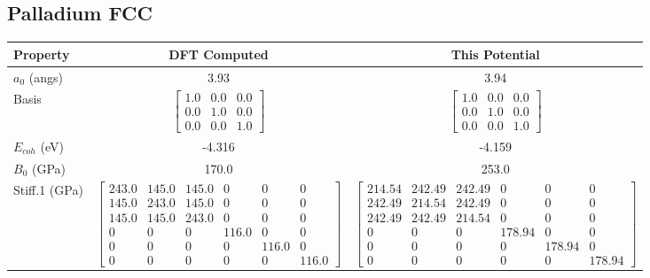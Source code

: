 
\clearpage
\FloatBarrier
\subsection{Palladium FCC}

\begin{table}[ht]
\renewcommand{\arraystretch}{1.2}
\begin{tabular}{lcccccc}
\hline\hline
Property & \multicolumn{3}{c}{DFT Computed} & \multicolumn{3}{c}{This Potential} \\
\hline\hline
$a_0$ (angs)         & \multicolumn{3}{c}{3.93}   & \multicolumn{3}{c}{3.94} \\
Basis            & \multicolumn{3}{c}{$\begin{bmatrix} 1.0 & 0.0 & 0.0 \\ 0.0 & 1.0 & 0.0 \\ 0.0 & 0.0 & 1.0  \end{bmatrix}$} & \multicolumn{3}{c}{$\begin{bmatrix} 1.0 & 0.0 & 0.0 \\ 0.0 & 1.0 & 0.0 \\ 0.0 & 0.0 & 1.0  \end{bmatrix}$} \\
$E_{coh}$ (eV)           & \multicolumn{3}{c}{-4.316}  & \multicolumn{3}{c}{-4.159} \\
$B_0$ (GPa)              & \multicolumn{3}{c}{170.0}  & \multicolumn{3}{c}{253.0} \\
Stiff.1 (GPa) & \multicolumn{3}{c}{$\begin{bmatrix} 243.0 & 145.0 & 145.0 & 0 & 0 & 0 \\ 145.0 & 243.0 & 145.0 & 0 & 0 & 0 \\ 145.0 & 145.0 & 243.0 & 0 & 0 & 0 \\ 0 & 0 & 0 & 116.0 & 0 & 0 \\ 0 & 0 & 0 & 0 & 116.0 & 0 \\ 0 & 0 & 0 & 0 & 0 & 116.0 \end{bmatrix}$}   & \multicolumn{3}{c}{$\begin{bmatrix} 214.54 & 242.49 & 242.49 & 0 & 0 & 0 \\ 242.49 & 214.54 & 242.49 & 0 & 0 & 0 \\ 242.49 & 242.49 & 214.54 & 0 & 0 & 0 \\ 0 & 0 & 0 & 178.94 & 0 & 0 \\ 0 & 0 & 0 & 0 & 178.94 & 0 \\ 0 & 0 & 0 & 0 & 0 & 178.94 \end{bmatrix}$} \\

\end{tabular}
\end{table}
